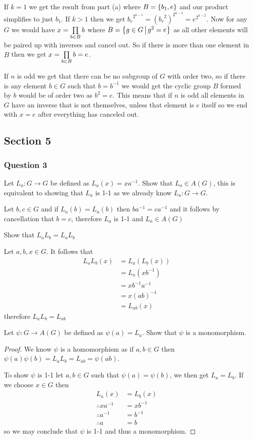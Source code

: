 \documentclass{article}
\begin{document}
If $k=1$ we get the result from part (a) where $B = \left\{ {b_1,e} \right\}$ and our product simplifies to just $b_1$. If $k > 1$ then we get ${b_r}^{2^{k-1}} = \left({b_r}^2\right)^{2^{k-2}} = e^{2^{k-2}}$. Now for any $G$ we would have $x = \prod\limits_{b\in B}^{} {b} $ where $B = \left\{{g\in G} \,\middle|\, {g^2 = e}\right\}$ as all other elements will be paired up with inverses and cancel out. So if there is more than one element in $B$ then we get $x = \prod\limits_{b\in B}^{} {b}  = e$.

 If $n$ is odd we get that there can be no subgroup of $G$ with order two, so if there is any element $b\in G$ such that $b = b^{-1}$ we would get the cyclic group $B$ formed by $b$ would be of order two as $b^2 = e$. This means that if $n$ is odd all elements in $G$ have an inverse that is not themselves, unless that element is $e$ itself so we end with $x = e$ after everything has canceled out.

\subsection{Section 5}
\subsubsection{Question 3}

Let $L_a: G\to G$ be defined as $L_a(x) = xa^{-1}$.
 Show that $L_a \in A(G)$, this is equivalent to showing that $L_a$ is 1-1 as we already know $L_a:G\to G$.

Let $b,c \in G$ and if $L_a(b)=L_a(b)$ then $ba^{-1} = ca^{-1}$ and it follows by cancellation that $b=c$, therefore $L_a$ is 1-1 and $L_a\in A(G)$

 Show that $L_aL_b = L_aL_b$

Let $a,b,x\in G$. It follows that
\begin{align*}
L_aL_b(x) &= L_a(L_b(x)) \\
&= L_a(xb^{-1})\\
&=xb^{-1}a^{-1}\\
&=x(ab)^{-1}\\
&=L_{ab}(x)
\end{align*}
therefore $L_aL_b = L_{ab}$

 Let $\psi:G\to A(G)$ be defined as $\psi(a) = L_a$. Show that $\psi$ is a monomorphism.

\begin{proof}
	We know $\psi$ is a homomorphism as if $a,b\in G$ then $\psi(a)\psi(b) = L_aL_b = L_{ab} = \psi(ab)$.
	
	To show $\psi$ is 1-1 let $a,b\in G$ such that $\psi(a) = \psi(b)$, we then get $L_a=L_b$. If we choose $x\in G$ then
	\begin{align*}
	L_a(x) &= L_b(x) \\
	\therefore xa^{-1}&=xb^{-1} \\
	\therefore a^{-1}&=b^{-1} \\
	\therefore a&=b
	\end{align*}
	so we may conclude that $\psi$ is 1-1 and thus a monomorphism.
\end{proof}
\end{document}
